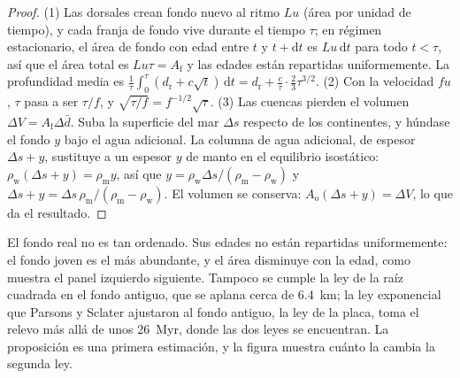 \begin{proof}
(1) Las dorsales crean fondo nuevo al ritmo $Lu$ (área por unidad de tiempo), y cada franja de fondo vive
durante el tiempo $\tau$; en régimen estacionario, el área de fondo con edad entre $t$ y $t + \mathrm{d}t$
es $Lu\,\mathrm{d}t$ para todo $t < \tau$, así que el área total es $Lu\tau = A_{\text{f}}$ y las
edades están repartidas uniformemente. La profundidad media es
$\frac1\tau\int_0^\tau (d_{\text{r}} + c\sqrt t)\,\mathrm{d}t = d_{\text{r}} + \frac{c}{\tau}
\cdot\frac23\tau^{3/2}$. (2) Con la velocidad $fu$, $\tau$ pasa a ser $\tau/f$, y
$\sqrt{\tau/f} = f^{-1/2}\sqrt\tau$. (3) Las cuencas pierden el volumen $\Delta V = A_{\text{f}}
\Delta\bar d$. Suba la superficie del mar $\Delta s$ respecto de los continentes, y húndase el fondo
$y$ bajo el agua adicional. La columna de agua adicional, de espesor $\Delta s + y$, sustituye a un
espesor $y$ de manto en el equilibrio isostático: $\rho_{\text{w}}(\Delta s + y) =
\rho_{\text{m}} y$, así que $y = \rho_{\text{w}}\Delta s/(\rho_{\text{m}} - \rho_{\text{w}})$ y
$\Delta s + y = \Delta s\,\rho_{\text{m}}/(\rho_{\text{m}} - \rho_{\text{w}})$. El volumen se
conserva: $A_{\text{o}}(\Delta s + y) = \Delta V$, lo que da el resultado.
\end{proof}

El fondo real no es tan ordenado. Sus edades no están repartidas uniformemente: el fondo joven es el más abundante,
y el área disminuye con la edad, como muestra el panel izquierdo siguiente. Tampoco se cumple la ley de la raíz cuadrada en el
fondo antiguo, que se aplana cerca de \qty{6.4}{km}; la ley exponencial que Parsons y Sclater
ajustaron al fondo antiguo, la ley de la placa, toma el relevo más allá de unos \qty{26}{Myr}, donde las dos leyes
se encuentran. La proposición es una primera estimación, y la figura
muestra cuánto la cambia la segunda ley.


